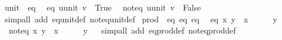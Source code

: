 \begin{isabellebody}
\endisatagproof
{\isafoldproof}%
%
\isadelimproof
%
\endisadelimproof
\isanewline
\isanewline
{}\isamarkupfalse%
\isanewline
\isanewline
{}\isamarkupfalse%
\ unit\ {\isacharcolon}{\isacharcolon}\ eq\isanewline
{}\isanewline
\isanewline
{}\isamarkupfalse%
\isanewline
\ \ {\isachardoublequoteopen}eq\ {\isacharparenleft}u{\isacharcolon}{\isacharcolon}unit{\isacharparenright}\ v\ {\isasymlongleftrightarrow}\ True{\isachardoublequoteclose}\isanewline
\isanewline
{}\isamarkupfalse%
\isanewline
\ \ {\isachardoublequoteopen}not{\isacharunderscore}eq\ {\isacharparenleft}u{\isacharcolon}{\isacharcolon}unit{\isacharparenright}\ v\ {\isasymlongleftrightarrow}\ False{\isachardoublequoteclose}\isanewline
\isanewline
{}\isamarkupfalse%
%
\isadelimproof
\ %
\endisadelimproof
%
\isatagproof
{}\isamarkupfalse%
\isanewline
{}\isamarkupfalse%
\ {\isacharparenleft}simp{\isacharunderscore}all\ add{\isacharcolon}\ eq{\isacharunderscore}unit{\isacharunderscore}def\ not{\isacharunderscore}eq{\isacharunderscore}unit{\isacharunderscore}def{\isacharparenright}%
\endisatagproof
{\isafoldproof}%
%
\isadelimproof
%
\endisadelimproof
\isanewline
\isanewline
{}\isamarkupfalse%
\isanewline
\isanewline
{}\isamarkupfalse%
\ prod\ {\isacharcolon}{\isacharcolon}\ {\isacharparenleft}eq{\isacharcomma}\ eq{\isacharparenright}\ eq\isanewline
{}\isanewline
\isanewline
{}\isamarkupfalse%
\isanewline
\ \ {\isachardoublequoteopen}eq\ x\ y\ {\isasymlongleftrightarrow}\ {\isacharparenleft}x\ {\isacharcolon}{\isacharcolon}\ {\isacharunderscore}\ {\isacharasterisk}\ {\isacharunderscore}{\isacharparenright}\ {\isacharequal}\ y{\isachardoublequoteclose}\isanewline
\isanewline
{}\isamarkupfalse%
\isanewline
\ \ {\isachardoublequoteopen}not{\isacharunderscore}eq\ x\ y\ {\isasymlongleftrightarrow}\ {\isacharparenleft}x\ {\isacharcolon}{\isacharcolon}\ {\isacharunderscore}\ {\isacharasterisk}\ {\isacharunderscore}{\isacharparenright}\ {\isasymnoteq}\ y{\isachardoublequoteclose}\isanewline
\isanewline
{}\isamarkupfalse%
%
\isadelimproof
\ %
\endisadelimproof
%
\isatagproof
{}\isamarkupfalse%
\isanewline
{}\isamarkupfalse%
\ {\isacharparenleft}simp{\isacharunderscore}all\ add{\isacharcolon}\ eq{\isacharunderscore}prod{\isacharunderscore}def\ not{\isacharunderscore}eq{\isacharunderscore}prod{\isacharunderscore}def{\isacharparenright}%

\end{isabellebody}
